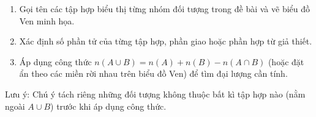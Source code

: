 \begin{enumerate}
\item Gọi tên các tập hợp biểu thị từng nhóm đối tượng trong đề bài và vẽ biểu đồ Ven minh họa.
\item Xác định số phần tử của từng tập hợp, phần giao hoặc phần hợp từ giả thiết.
\item Áp dụng công thức $n(A \cup B) = n(A) + n(B) - n(A \cap B)$ (hoặc đặt ẩn theo các miền rời nhau trên biểu đồ Ven) để tìm đại lượng cần tính.
\end{enumerate}
Lưu ý: Chú ý tách riêng những đối tượng không thuộc bất kì tập hợp nào (nằm ngoài $A \cup B$) trước khi áp dụng công thức.
